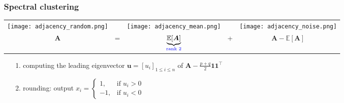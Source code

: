 \documentclass[compress,
mathserif,wide,%
]{beamer}
\begin{document}
\begin{frame}
\frametitle{Spectral clustering}

		
\begin{center}
\begin{tabular}{ccccc}
\texttt{[image: adjacency\_random.png]} &   & \texttt{[image: adjacency\_mean.png]} &  & \texttt{[image: adjacency\_noise.png]}\tabularnewline
	$\bm{A}$ & = & $\underset{\textcolor{blue}{ \text{rank 2}}}{\underbrace{\mathbb{E}[\bm{A}]}}$ & + & $\bm{A}-\mathbb{E}\left[\bm{A}\right]$\tabularnewline
\end{tabular}
\end{center}

\vspace{-0.5em}
\begin{itemize}
	\item[{\color{black}1.}] computing the leading eigenvector $\bm{u}=[u_i]_{1\leq i\leq n}$ of $\bm{A} - \frac{p+q}{2}\bm{1}\bm{1}^{\top}$
	\item[{\color{black}2.}] rounding:  output
		${x}_{i}=\begin{cases}
			1, & \text{if }u_{i}>0\\
			-1, & \text{if }u_{i}<0
\end{cases}$
\end{itemize}




\end{frame}
\end{document}
